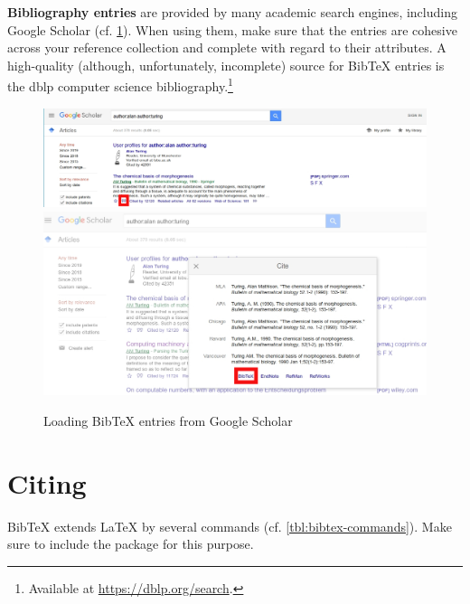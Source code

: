 \textbf{Bibliography entries} are provided by many academic search engines, including Google Scholar (cf. \cref{fig:google-scholar-bibtex}).
When using them, make sure that the entries are cohesive across your reference collection and complete with regard to their attributes.
A high-quality (although, unfortunately, incomplete) source for Bib\TeX{} entries is the dblp computer science bibliography.\footnote{Available at \url{https://dblp.org/search}.}

\begin{figure}[H]
  \includegraphics[width=\textwidth]{graphics/google_bibtex1.jpg}  
  \includegraphics[width=\textwidth]{graphics/google_bibtex2.jpg}  
  \caption{Loading Bib\TeX{} entries from Google Scholar}
  \label{fig:google-scholar-bibtex}
\end{figure}

\section{Citing}
Bib\TeX{} extends \LaTeX{} by several commands (cf. \cref{tbl:bibtex-commands}). 
Make sure to include the  package for this purpose.

